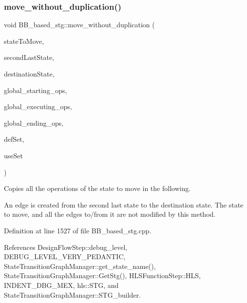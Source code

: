 \subsubsection{\texorpdfstring{move\+\_\+without\+\_\+duplication()}{move\_without\_duplication()}}
{\footnotesize\ttfamily void B\+B\+\_\+based\+\_\+stg\+::move\+\_\+without\+\_\+duplication (\begin{DoxyParamCaption}\item[{const \hyperlink{graph_8hpp_abefdcf0544e601805af44eca032cca14}{vertex}}]{state\+To\+Move,  }\item[{const \hyperlink{graph_8hpp_abefdcf0544e601805af44eca032cca14}{vertex}}]{second\+Last\+State,  }\item[{const \hyperlink{graph_8hpp_abefdcf0544e601805af44eca032cca14}{vertex}}]{destination\+State,  }\item[{const std\+::map$<$ \hyperlink{graph_8hpp_abefdcf0544e601805af44eca032cca14}{vertex}, std\+::list$<$ \hyperlink{graph_8hpp_abefdcf0544e601805af44eca032cca14}{vertex} $>$$>$ \&}]{global\+\_\+starting\+\_\+ops,  }\item[{const std\+::map$<$ \hyperlink{graph_8hpp_abefdcf0544e601805af44eca032cca14}{vertex}, std\+::list$<$ \hyperlink{graph_8hpp_abefdcf0544e601805af44eca032cca14}{vertex} $>$$>$ \&}]{global\+\_\+executing\+\_\+ops,  }\item[{const std\+::map$<$ \hyperlink{graph_8hpp_abefdcf0544e601805af44eca032cca14}{vertex}, std\+::list$<$ \hyperlink{graph_8hpp_abefdcf0544e601805af44eca032cca14}{vertex} $>$$>$ \&}]{global\+\_\+ending\+\_\+ops,  }\item[{const \hyperlink{classCustomOrderedSet}{Custom\+Ordered\+Set}$<$ unsigned int $>$ \&}]{def\+Set,  }\item[{const \hyperlink{classCustomOrderedSet}{Custom\+Ordered\+Set}$<$ unsigned int $>$ \&}]{use\+Set }\end{DoxyParamCaption})\hspace{0.3cm}{\ttfamily [private]}}



Copies all the operations of the state to move in the following. 

An edge is created from the second last state to the destination state. The state to move, and all the edges to/from it are not modified by this method. 

Definition at line 1527 of file B\+B\+\_\+based\+\_\+stg.\+cpp.



References Design\+Flow\+Step\+::debug\+\_\+level, D\+E\+B\+U\+G\+\_\+\+L\+E\+V\+E\+L\+\_\+\+V\+E\+R\+Y\+\_\+\+P\+E\+D\+A\+N\+T\+IC, State\+Transition\+Graph\+Manager\+::get\+\_\+state\+\_\+name(), State\+Transition\+Graph\+Manager\+::\+Get\+Stg(), H\+L\+S\+Function\+Step\+::\+H\+LS, I\+N\+D\+E\+N\+T\+\_\+\+D\+B\+G\+\_\+\+M\+EX, hls\+::\+S\+TG, and State\+Transition\+Graph\+Manager\+::\+S\+T\+G\+\_\+builder.



